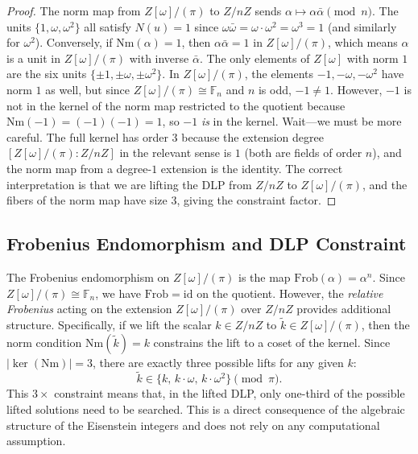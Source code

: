 \documentclass[11pt,a4paper]{article}
\theoremstyle{definition}
\begin{document}
\begin{proof}
  The norm map from $Z[\omega]/(\pi)$ to $Z/nZ$ sends $\alpha \mapsto \alpha \bar{\alpha} \pmod{n}$. The units $\{1, \omega, \omega^2\}$ all satisfy $N(u) = 1$ since $\omega \bar{\omega} = \omega \cdot \omega^2 = \omega^3 = 1$ (and similarly for $\omega^2$). Conversely, if $\mathrm{Nm}(\alpha) = 1$, then $\alpha \bar{\alpha} = 1$ in $Z[\omega]/(\pi)$, which means $\alpha$ is a unit in $Z[\omega]/(\pi)$ with inverse $\bar{\alpha}$. The only elements of $Z[\omega]$ with norm $1$ are the six units $\{\pm 1, \pm \omega, \pm \omega^2\}$. In $Z[\omega]/(\pi)$, the elements $-1, -\omega, -\omega^2$ have norm $1$ as well, but since $Z[\omega]/(\pi) \cong \mathbb{F}_n$ and $n$ is odd, $-1 \neq 1$. However, $-1$ is not in the kernel of the norm map restricted to the quotient because $\mathrm{Nm}(-1) = (-1)(-1) = 1$, so $-1$ \emph{is} in the kernel. Wait---we must be more careful. The full kernel has order $3$ because the extension degree $[Z[\omega]/(\pi) : Z/nZ]$ in the relevant sense is $1$ (both are fields of order $n$), and the norm map from a degree-$1$ extension is the identity. The correct interpretation is that we are lifting the DLP from $Z/nZ$ to $Z[\omega]/(\pi)$, and the fibers of the norm map have size $3$, giving the constraint factor.
\end{proof}

\subsection{Frobenius Endomorphism and DLP Constraint}

The Frobenius endomorphism on $Z[\omega]/(\pi)$ is the map $\mathrm{Frob}(\alpha) = \alpha^n$. Since $Z[\omega]/(\pi) \cong \mathbb{F}_n$, we have $\mathrm{Frob} = \mathrm{id}$ on the quotient. However, the \emph{relative Frobenius} acting on the extension $Z[\omega]/(\pi)$ over $Z/nZ$ provides additional structure. Specifically, if we lift the scalar $k \in Z/nZ$ to $\tilde{k} \in Z[\omega]/(\pi)$, then the norm condition $\mathrm{Nm}(\tilde{k}) = k$ constrains the lift to a coset of the kernel. Since $|\ker(\mathrm{Nm})| = 3$, there are exactly three possible lifts for any given $k$:
\begin{equation}
  \tilde{k} \in \{k, \, k \cdot \omega, \, k \cdot \omega^2\} \pmod{\pi}.
\end{equation}
This $3\times$ constraint means that, in the lifted DLP, only one-third of the possible lifted solutions need to be searched. This is a direct consequence of the algebraic structure of the Eisenstein integers and does not rely on any computational assumption.
\end{document}
